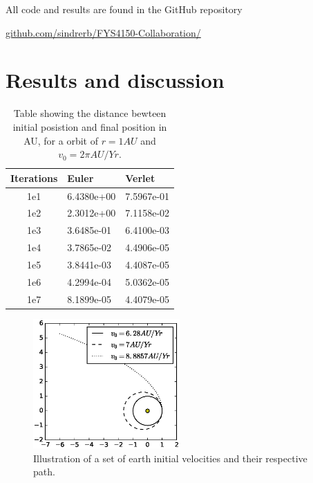 \documentclass[twoside,twocolumn]{article}
\newcommand{\nl}{
	
	\medskip
	\noindent
}
\begin{document}
All code and results are found in the GitHub repository\nl
{\small \href{https://github.com/sindrerb/FYS4150-Collaboration/tree/master/Doc/Project3}{github.com/sindrerb/FYS4150-Collaboration/}}
\section{Results and discussion}
\label{sec:results}

	
\begin{table}[h]
\caption{Table showing the distance bewteen initial posistion and final position in AU, for a orbit of $r=1AU$ and $v_0=2\pi AU/Yr$. }\label{tbl:convergence}
\centering
\begin{tabular}{|c|l|l|}\hline
Iterations & Euler & Verlet\\ \hline
1e1 & 6.4380e+00 & 7.5967e-01\\
1e2 & 2.3012e+00 & 7.1158e-02\\
1e3 & 3.6485e-01 & 6.4100e-03\\
1e4 & 3.7865e-02 & 4.4906e-05\\
1e5 & 3.8441e-03 & 4.4087e-05\\
1e6 & 4.2994e-04 & 5.0362e-05\\
1e7 & 8.1899e-05 & 4.4079e-05\\ \hline
\end{tabular}
\end{table}
\begin{figure}[p]
\includegraphics[width=0.5\textwidth]{figures/earthEsc.eps} 
		\caption{Illustration of a set of earth initial velocities and their respective path.}\label{fig:earth_vel}
\end{figure}
\end{document}
